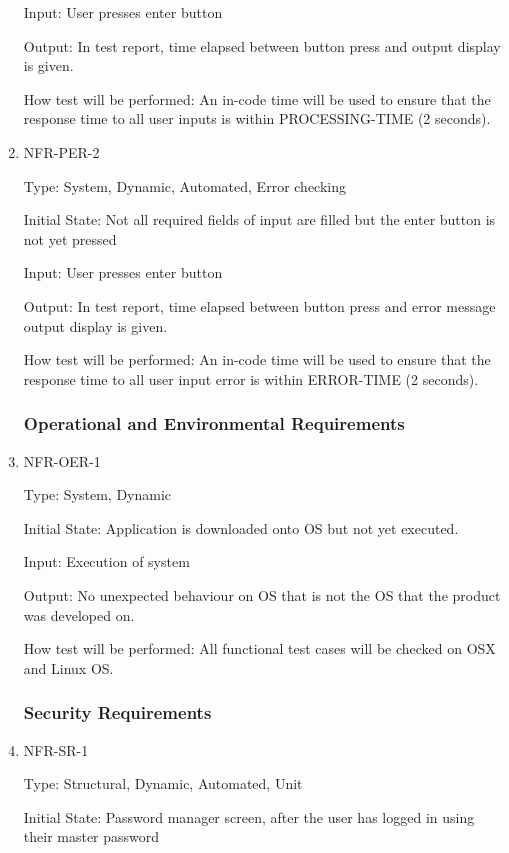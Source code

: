 \documentclass[12pt, titlepage]{article}
\begin{document}
\begin{enumerate}
Input: User presses enter button

Output: In test report, time elapsed between button press and output display is given.

How test will be performed: An in-code time will be used to ensure that the response time to all user inputs is within PROCESSING-TIME (2 seconds).

\item{NFR-PER-2\\}

Type: System, Dynamic, Automated, Error checking

Initial State: Not all required fields of input are filled but the enter button is not yet pressed

Input: User presses enter button

Output: In test report, time elapsed between button press and error message output display is given.

How test will be performed: An in-code time will be used to ensure that the response time to all user input error is within ERROR-TIME (2 seconds).

\subsubsection{Operational and Environmental Requirements}

\item{NFR-OER-1\\}

Type: System, Dynamic

Initial State: Application is downloaded onto OS but not yet executed.

Input: Execution of system

Output: No unexpected behaviour on OS that is not the OS that the product was developed on.

How test will be performed: All functional test cases will be checked on OSX and Linux OS.

\subsubsection{Security Requirements}

\item{NFR-SR-1\\}

Type: Structural, Dynamic, Automated, Unit

Initial State: Password manager screen, after the user has logged in using their master password


\end{enumerate}
\end{document}
